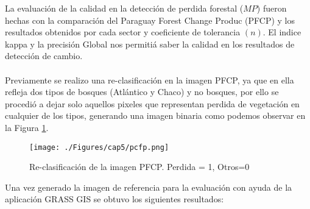 La evaluaci\'on de la calidad en la detecci\'on de perdida forestal ($ MP $) fueron hechas con la comparaci\'on del Paraguay Forest Change Produc (PFCP) y los resultados obtenidos por cada sector y coeficiente de tolerancia $ (n) $. El indice kappa y la precisi\'on Global nos permiti\'a saber la calidad en los resultados de detecci\'on de cambio.\\~\\
Previamente se realizo una re-clasificaci\'on en la imagen PFCP, ya que en ella refleja dos tipos de bosques (Atl\'antico y Chaco) y no bosques, por ello se procedi\'o a dejar solo aquellos pixeles que representan perdida de vegetaci\'on en cualquier de los tipos, generando una imagen binaria como podemos observar en la Figura \ref{fig:pfcp}.
\begin{figure}[H]
	\centering
	\texttt{[image: ./Figures/cap5/pcfp.png]}
	\caption{Re-clasificaci\'on de la imagen PFCP. Perdida = 1, Otros=0}
	\label{fig:pfcp}
\end{figure}
Una vez generado la imagen de referencia para la evaluaci\'on con ayuda de la aplicaci\'on GRASS GIS se obtuvo los siguientes resultados:
